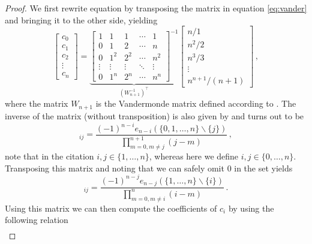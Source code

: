 \documentclass{article}
\newcommand{\setminusD}{\mathbin{\backslash}}
\begin{document}
\begin{proof}
We first rewrite equation by transposing the matrix in equation \ref{eq:vander} and bringing it to the other side, yielding
\begin{equation}
    \begin{bmatrix}
        c_0 \\
        c_1 \\
        c_2 \\
        \vdots \\
        c_n
    \end{bmatrix}
    =
    \underbrace{\begin{bmatrix}
        1&1&1&\cdots&1 \\
        0&1&2&\cdots&n \\
        0&1^2&2^2&\cdots&n^2 \\
        \vdots&\vdots & \vdots & \ddots & \vdots\\
        0&1^n&2^n&\cdots&n^n
    \end{bmatrix}^{-1}}_{(W_{n+1}^{-1})^\top}
    \begin{bmatrix}
        n/1\\
        n^2/2\\
        n^3/3\\
        \vdots \\
        n^{n+1}/(n+1)
    \end{bmatrix} \,, \nonumber
\end{equation}
where the matrix $W_{n+1}$ is the Vandermonde matrix defined according to \citeauthor{stirling_vandermonde} \cite{stirling_vandermonde}.
The inverse of the matrix (without transposition) is also given by \citeauthor{stirling_vandermonde} and turns out to be
\begin{equation}
    [W_{n+1}^{-1}]_{ij} = \frac{(-1)^{n-i} e_{n-i} (\{ 0, 1, \dots, n \} \setminusD \{ j \})}{\prod^{n+1}_{m=0, m\neq j} (j - m)} \,, \nonumber
\end{equation}
note that in the citation $i,j \in \{ 1, \dots, n \}$, whereas here we define $i,j \in \{ 0, \dots, n \}$.
Transposing this matrix and noting that we can safely omit $0$ in the set yields
\begin{equation}
    [(W_{n+1}^{-1})^\top]_{ij} = \frac{(-1)^{n-j} e_{n-j} (\{ 1, \dots, n \} \setminusD \{ i \})}{\prod^{n}_{m=0, m\neq i} (i - m)} \,. \nonumber
\end{equation}
Using this matrix we can then compute the coefficients of $c_i$ by using the following relation
\begin{align}

\end{align}
\end{proof}
\end{document}
